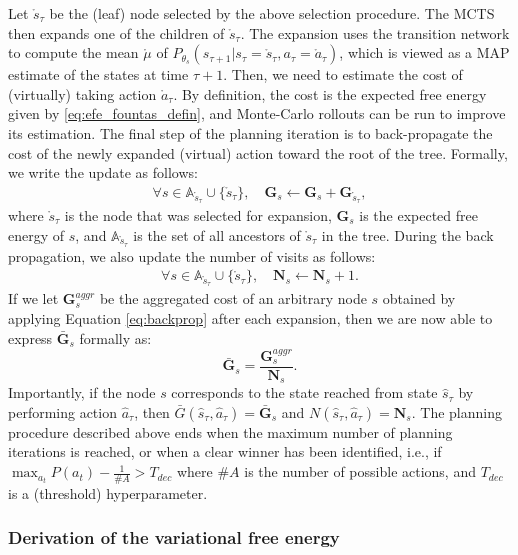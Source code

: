 \documentclass[twoside,11pt]{article}
\begin{document}
Let $\mathring{s}_\tau$ be the (leaf) node selected by the above selection procedure. The MCTS then expands one of the children of $\mathring{s}_\tau$. The expansion uses the transition network to compute the mean $\mathring{\mu}$ of $P_{\theta_s}(s_{\tau+1}|s_\tau=\mathring{s}_\tau, a_\tau=\mathring{a}_\tau)$, which is viewed as a MAP estimate of the states at time $\tau+1$. Then, we need to estimate the cost of (virtually) taking action $\mathring{a}_\tau$. By definition, the cost is the expected free energy given by \eqref{eq:efe_fountas_defin}, and Monte-Carlo rollouts can be run to improve its estimation. The final step of the planning iteration is to back-propagate the cost of the newly expanded (virtual) action toward the root of the tree. Formally, we write the update as follows:
\begin{align}\label{eq:backprop}
\forall s \in \mathbb{A}_{\mathring{s}_\tau} \cup \{\mathring{s}_\tau \}, \quad \bm{G}_{s} \leftarrow \bm{G}_{s} + \bm{G}_{\mathring{s}_\tau},
\end{align}
where $\mathring{s}_\tau$ is the node that was selected for expansion, $\bm{G}_{s}$ is the expected free energy of $s$, and $\mathbb{A}_{\mathring{s}_\tau}$ is the set of all ancestors of $\mathring{s}_\tau$ in the tree. During the back propagation, we also update the number of visits as follows:
\begin{align}\label{eq:backprop_n}
\forall s \in \mathbb{A}_{\mathring{s}_\tau} \cup \{\mathring{s}_\tau \}, \quad \bm{N}_{s} \leftarrow \bm{N}_{s} + 1.
\end{align}
If we let $\bm{G}^{aggr}_s$ be the aggregated cost of an arbitrary node $s$ obtained by applying Equation \ref{eq:backprop} after each expansion, then we are now able to express $\bar{\bm{G}}_s$ formally as:
$$\bar{\bm{G}}_s = \frac{\bm{G}^{aggr}_s}{\bm{N}_s}.$$
Importantly, if the node $s$ corresponds to the state reached from state $\hat{s}_\tau$ by performing action $\hat{a}_\tau$, then $\bar{G}(\hat{s}_\tau, \hat{a}_\tau) = \bar{\bm{G}}_s$ and $N(\hat{s}_\tau, \hat{a}_\tau) = \bm{N}_s$. The planning procedure described above ends when the maximum number of planning iterations is reached, or when a clear winner has been identified, i.e., if $\max_{a_t} P(a_t)-\frac{1}{\#A}>T_{dec}$ where $\#A$ is the number of possible actions, and $T_{dec}$ is a (threshold) hyperparameter.

\subsubsection{Derivation of the variational free energy}\label{ssec:derive_vfe_in_fountas}
\end{document}
